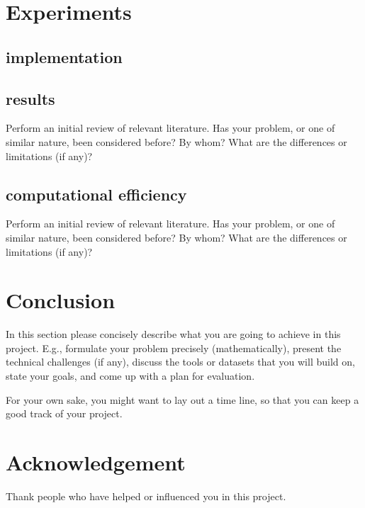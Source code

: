 \documentclass{article}
\begin{document}
\section{Experiments}

\subsection{implementation}

\subsection{results}
Perform an initial review of relevant literature. Has your problem, or one of similar nature, been considered before? By whom? What are the differences or limitations (if any)?

\subsection{computational efficiency}
Perform an initial review of relevant literature. Has your problem, or one of similar nature, been considered before? By whom? What are the differences or limitations (if any)?

\section{Conclusion}
In this section please concisely describe what you are going to achieve in this project. E.g., formulate your problem precisely (mathematically), present the technical challenges (if any), discuss the tools or datasets that you will build on, state your goals, and come up with a plan for evaluation.

For your own sake, you might want to lay out a time line, so that you can keep a good track of your project.

\newpage

\section*{Acknowledgement}
Thank people who have helped or influenced you in this project.

\nocite{*}



\end{document}
